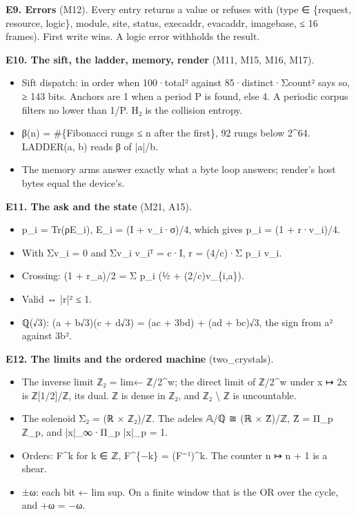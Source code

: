 \textbf{E9. Errors} (M12). Every entry returns a value or refuses with (type ∈ \{request, resource, logic\}, module, site, status, execaddr, evacaddr, imagebase, ≤ 16 frames). First write wins. A logic error withholds the result.

\textbf{E10. The sift, the ladder, memory, render} (M11, M15, M16, M17).

\begin{itemize}
\item Sift dispatch: in order when 100·total² against 85·distinct·Σcount² says so, ≥ 143 bits. Anchors are 1 when a period P is found, else 4. A periodic corpus filters no lower than 1/P. H₂ is the collision entropy.
\item β(n) = \#\{Fibonacci rungs ≤ n after the first\}, 92 rungs below 2\textasciicircum{}64. LADDER(a, b) reads β of |a|/b.
\item The memory arms answer exactly what a byte loop answers; render's host bytes equal the device's.
\end{itemize}

\textbf{E11. The ask and the state} (M21, A15).

\begin{itemize}
\item p\_\allowbreak{}i = Tr(ρE\_\allowbreak{}i), E\_\allowbreak{}i = (I + v\_\allowbreak{}i·σ)/4, which gives p\_\allowbreak{}i = (1 + r·v\_\allowbreak{}i)/4.
\item With Σv\_\allowbreak{}i = 0 and Σv\_\allowbreak{}i v\_\allowbreak{}iᵀ = c·I, r = (4/c)·Σ p\_\allowbreak{}i v\_\allowbreak{}i.
\item Crossing: (1 + r\_\allowbreak{}a)/2 = Σ p\_\allowbreak{}i (½ + (2/c)v\_\allowbreak{}\{i,a\}).
\item Valid ⇔ |r|² ≤ 1.
\item ℚ(√3): (a + b√3)(c + d√3) = (ac + 3bd) + (ad + bc)√3, the sign from a² against 3b².
\end{itemize}

\textbf{E12. The limits and the ordered machine} (two\_\allowbreak{}crystals).

\begin{itemize}
\item The inverse limit ℤ₂ = lim← ℤ/2\textasciicircum{}w; the direct limit of ℤ/2\textasciicircum{}w under x ↦ 2x is ℤ[1/2]/ℤ, its dual. ℤ is dense in ℤ₂, and ℤ₂ \textbackslash{} ℤ is uncountable.
\item The solenoid Σ₂ = (ℝ × ℤ₂)/ℤ. The adeles 𝔸/ℚ ≅ (ℝ × Ẑ)/ℤ, Ẑ = Π\_\allowbreak{}p ℤ\_\allowbreak{}p, and |x|\_\allowbreak{}∞·Π\_\allowbreak{}p |x|\_\allowbreak{}p = 1.
\item Orders: F\textasciicircum{}k for k ∈ ℤ, F\textasciicircum{}\{−k\} = (F⁻¹)\textasciicircum{}k. The counter n ↦ n + 1 is a shear.
\item ±ω: each bit ← lim sup. On a finite window that is the OR over the cycle, and +ω = −ω.
\end{itemize}

